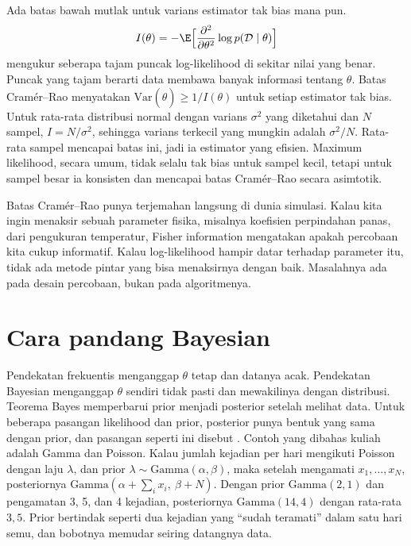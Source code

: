Ada batas bawah mutlak untuk varians estimator tak bias mana pun. 
\begin{equation}
I(\theta)=-\E\Big[\frac{\partial^2}{\partial\theta^2}\log p(\mathcal D\mid\theta)\Big]
\end{equation}
mengukur seberapa tajam puncak log-likelihood di sekitar nilai yang benar. Puncak yang tajam
berarti data membawa banyak informasi tentang $\theta$. Batas Cramér--Rao menyatakan
$\mathrm{Var}(\hat\theta)\ge1/I(\theta)$ untuk setiap estimator tak bias. Untuk rata-rata distribusi
normal dengan varians $\sigma^2$ yang diketahui dan $N$ sampel, $I=N/\sigma^2$, sehingga varians
terkecil yang mungkin adalah $\sigma^2/N$. Rata-rata sampel mencapai batas ini, jadi ia estimator
yang efisien. Maximum likelihood, secara umum, tidak selalu tak bias untuk sampel kecil, tetapi
untuk sampel besar ia konsisten dan mencapai batas Cramér--Rao secara asimtotik.

Batas Cramér--Rao punya terjemahan langsung di dunia simulasi. Kalau kita ingin menaksir sebuah
parameter fisika, misalnya koefisien perpindahan panas, dari pengukuran temperatur, Fisher
information mengatakan apakah percobaan kita cukup informatif. Kalau log-likelihood hampir datar
terhadap parameter itu, tidak ada metode pintar yang bisa menaksirnya dengan baik. Masalahnya ada
pada desain percobaan, bukan pada algoritmenya.

\section{Cara pandang Bayesian}

Pendekatan frekuentis menganggap $\theta$ tetap dan datanya acak. Pendekatan Bayesian menganggap
$\theta$ sendiri tidak pasti dan mewakilinya dengan distribusi. Teorema Bayes memperbarui prior
menjadi posterior setelah melihat data. Untuk beberapa pasangan likelihood dan prior, posterior
punya bentuk yang sama dengan prior, dan pasangan seperti ini disebut . Contoh yang
dibahas kuliah adalah Gamma dan Poisson. Kalau jumlah kejadian per hari mengikuti Poisson dengan
laju $\lambda$, dan prior $\lambda\sim\mathrm{Gamma}(\alpha,\beta)$, maka setelah mengamati
$x_1,\dots,x_N$, posteriornya $\mathrm{Gamma}(\alpha+\sum_ix_i,\ \beta+N)$. Dengan prior
$\mathrm{Gamma}(2,1)$ dan pengamatan 3, 5, dan 4 kejadian, posteriornya $\mathrm{Gamma}(14,4)$ dengan
rata-rata $3{,}5$. Prior bertindak seperti dua kejadian yang ``sudah teramati'' dalam satu hari
semu, dan bobotnya memudar seiring datangnya data.

